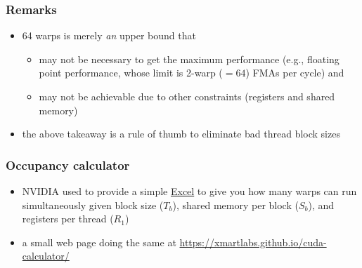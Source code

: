 \documentclass[12pt,dvipdfmx]{beamer}
\begin{document}
\begin{frame}
  \frametitle{Remarks}
  \begin{itemize}
  \item 64 warps is merely {\it an} upper bound that
    \begin{itemize}
    \item may not be necessary to get the maximum performance (e.g., floating point
      performance, whose limit is 2-warp ($= 64$) FMAs per cycle) and
    \item may not be achievable due to other constraints (registers and shared memory)
    \end{itemize}
  \item the above takeaway is a rule of thumb to eliminate bad thread block sizes
  \end{itemize}
\end{frame}

\begin{frame}
  \frametitle{Occupancy calculator}
  \begin{itemize}
  \item NVIDIA used to provide a simple
    \href{https://docs.nvidia.com/cuda/cuda-occupancy-calculator/index.html}{Excel} to give you how many warps
    can run simultaneously given block size ($T_b$), shared memory per block ($S_b$), and
    registers per thread ($R_1$)
    
  \item a small web page doing the same at
    \url{https://xmartlabs.github.io/cuda-calculator/}
    
  \end{itemize}
\end{frame}
\end{document}
